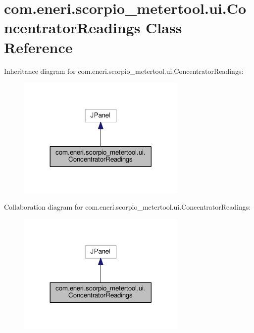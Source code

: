 \hypertarget{classcom_1_1eneri_1_1scorpio__metertool_1_1ui_1_1_concentrator_readings}{}\section{com.\+eneri.\+scorpio\+\_\+metertool.\+ui.\+Concentrator\+Readings Class Reference}
\label{classcom_1_1eneri_1_1scorpio__metertool_1_1ui_1_1_concentrator_readings}


Inheritance diagram for com.\+eneri.\+scorpio\+\_\+metertool.\+ui.\+Concentrator\+Readings\+:
\nopagebreak
\begin{figure}[H]
\begin{center}
\leavevmode
\includegraphics[width=233pt]{classcom_1_1eneri_1_1scorpio__metertool_1_1ui_1_1_concentrator_readings__inherit__graph}
\end{center}
\end{figure}


Collaboration diagram for com.\+eneri.\+scorpio\+\_\+metertool.\+ui.\+Concentrator\+Readings\+:
\nopagebreak
\begin{figure}[H]
\begin{center}
\leavevmode
\includegraphics[width=233pt]{classcom_1_1eneri_1_1scorpio__metertool_1_1ui_1_1_concentrator_readings__coll__graph}
\end{center}
\end{figure}
